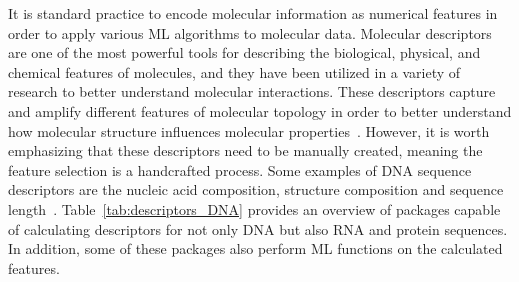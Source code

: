It is standard practice to encode molecular information as numerical features in order to apply various \gls{ML} algorithms to molecular data. Molecular descriptors are one of the most powerful tools for describing the biological, physical, and chemical features of molecules, and they have been utilized in a variety of research to better understand molecular interactions. These descriptors capture and amplify different features of molecular topology in order to better understand how molecular structure influences molecular properties~\cite{Dong2018PyBioMed:Interactions}. However, it is worth emphasizing that these descriptors need to be manually created, meaning the feature selection is a handcrafted process. Some examples of \gls{DNA} sequence descriptors are the nucleic acid composition, structure composition and sequence length~\cite{Liu2017BioSeq-Analysis:Approaches,Chen2019ILearn:Data,Bonidia2021MathFeature:Descriptors}. Table~\ref{tab:descriptors_DNA} provides an overview of packages capable of calculating descriptors for not only \gls{DNA} but also \gls{RNA} and protein sequences. In addition, some of these packages also perform \gls{ML} functions on the calculated features.

